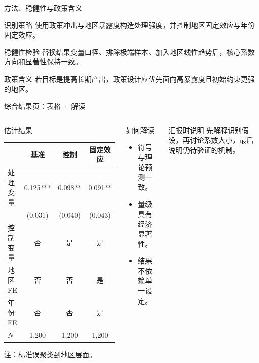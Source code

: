 \begin{frame}{方法、稳健性与政策含义}
  \begin{methodbox}{识别策略}
    使用政策冲击与地区暴露度构造处理强度，并控制地区固定效应与年份固定效应。
  \end{methodbox}

  \begin{robustbox}{稳健性检验}
    替换结果变量口径、排除极端样本、加入地区线性趋势后，核心系数方向和显著性保持一致。
  \end{robustbox}

  \begin{policybox}{政策含义}
    若目标是提高长期产出，政策设计应优先面向高暴露度且初始约束更强的地区。
  \end{policybox}
\end{frame}

\begin{frame}[shrink=8]{综合结果页：表格 + 解读}
  \begin{columns}[T]
      \begin{regressionbox}{估计结果}
        \begin{center}
          \scriptsize
          \begin{tabular}{lccc}
            \toprule
            & 基准 & 控制 & 固定效应 \\
            \midrule
            处理变量 & 0.125*** & 0.098** & 0.091** \\
                     & (0.031)  & (0.040) & (0.043) \\
            控制变量 & 否 & 是 & 是 \\
            地区 FE  & 否 & 否 & 是 \\
            年份 FE  & 否 & 否 & 是 \\
            $N$      & 1{,}200 & 1{,}200 & 1{,}200 \\
            \bottomrule
          \end{tabular}
        \end{center}
        {\tiny 注：标准误聚类到地区层面。}
      \end{regressionbox}
      \begin{findingbox}{如何解读}
        \begin{itemize}
          \item 符号与理论预测一致。
          \item 量级具有经济显著性。
          \item 结果不依赖单一设定。
        \end{itemize}
      \end{findingbox}

      \begin{cautionbox}{汇报时说明}
        先解释识别假设，再讨论系数大小，最后说明仍待验证的机制。
      \end{cautionbox}
  \end{columns}
\end{frame}

